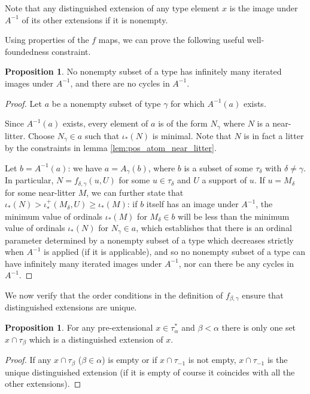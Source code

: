 \documentclass{article}
\theoremstyle{definition}
\newtheorem{proposition}[theorem]{Proposition}
\theoremstyle{remark}
\begin{document}
{Note that any distinguished extension of any type element $x$ is the image under $A^{-1}$ of its other extensions if it is nonempty.

Using properties of the $f$ maps, we can prove the following useful well-foundedness constraint.

\begin{proposition}\label{prop:a_map_well_founded}
No nonempty subset of a type has infinitely many iterated images under $A^{-1}$, and there are no cycles in $A^{-1}$.
\end{proposition}
\begin{proof}
Let $a$ be a nonempty subset of type $\gamma$ for which $A^{-1}(a)$ exists.

Since $A^{-1}(a)$ exists, every element of $a$ is of the form $N_\gamma$ where $N$ is a near-litter.  Choose $N_\gamma \in a$ such that $\iota_*(N)$ is minimal.  Note that $N$ is in fact a litter by the constraints in lemma \ref{lem:pos_atom_near_litter}.

Let $b = A^{-1}(a)$:  we have $a = A_\gamma(b)$, where $b$ is a subset of some $\tau_\delta$ with $\delta \neq \gamma$.  In particular, $N = f_{\delta,\gamma}(u,U)$ for
some $u \in \tau_\delta$ and $U$ a support of $u$.  If $u=M_\delta$ for some near-litter $M$, we can further state that $\iota_*(N) > \iota^+_*(M_\delta,U) \geq \iota_*(M)$:  if $b$ itself has an image under $A^{-1}$, the minimum value of ordinals $\iota_*(M)$ for $M_\delta \in b$ will be less than the minimum value of ordinals $\iota_*(N)$ for $N_\gamma\in a$, which establishes that there is an ordinal parameter determined by a nonempty subset of a type which decreases strictly when $A^{-1}$ is applied (if it is applicable), and so no nonempty subset of a type
can have infinitely many iterated images under $A^{-1}$, nor can there be any cycles in $A^{-1}$.
\end{proof}

We now verify that the order conditions in the definition of $f_{\beta,\gamma}$ ensure that distinguished extensions are unique.
\begin{proposition}\label{prop:distinguished_extension_unique}
For any pre-extensional $x \in \tau_\alpha^*$ and $\beta<\alpha$ there is only one set $x \cap \tau_\beta$ which is a distinguished extension of $x$.
\end{proposition}
\begin{proof}
If any $x \cap \tau_\beta$ ($\beta \in \alpha$) is empty or if $x \cap \tau_{-1}$ is not empty, $x \cap \tau_{-1}$ is the unique distinguished extension
(if it is empty of course it coincides with all the other extensions).


\end{proof}}
\end{document}
